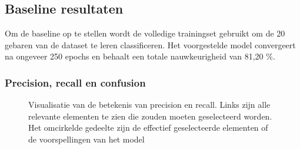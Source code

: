 \subsection{Baseline resultaten}
Om de baseline op te stellen wordt de volledige trainingset gebruikt om de 20 gebaren van de dataset te leren classificeren. Het voorgestelde model convergeert na ongeveer 250 epochs en behaalt een totale nauwkeurigheid van 81,20 \%.

\subsubsection{Precision, recall en confusion}\label{sec:pr-conf}
\begin{figure}
	\centering
	\def\svgwidth{0.7\columnwidth}
	
	\caption{Visualisatie van de betekenis van precision en recall. Links zijn alle relevante elementen te zien die zouden moeten geselecteerd worden. Het omcirkelde gedeelte zijn de effectief geselecteerde elementen of de voorspellingen van het model}
	\label{fig:prec+recall}
\end{figure}

